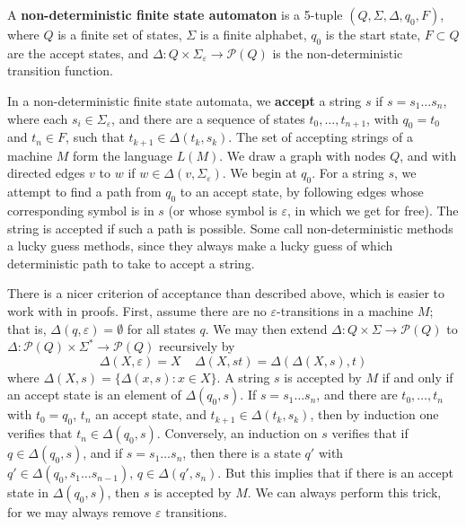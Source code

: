 A {\bf non-deterministic finite state automaton} is a 5-tuple $(Q, \Sigma, \Delta, q_0, F)$, where $Q$ is a finite set of states, $\Sigma$ is a finite alphabet, $q_0$ is the start state, $F \subset Q$ are the accept states, and $\Delta: Q \times \Sigma_\varepsilon \to \mathcal{P}(Q)$ is the non-deterministic transition function.

In a non-deterministic finite state automata, we {\bf accept} a string $s$ if $s = s_1 \dots s_n$, where each $s_i \in \Sigma_\varepsilon$, and there are a sequence of states $t_0, \dots, t_{n+1}$, with $q_0 = t_0$ and $t_n \in F$, such that $t_{k+1} \in \Delta(t_k, s_k)$. The set of accepting strings of a machine $M$ form the language $L(M)$. We draw a graph with nodes $Q$, and with directed edges $v$ to $w$ if $w \in \Delta(v, \Sigma_{\varepsilon})$. We begin at $q_0$. For a string $s$, we attempt to find a path from $q_0$ to an accept state, by following edges whose corresponding symbol is in $s$ (or whose symbol is $\varepsilon$, in which we get for free). The string is accepted if such a path is possible. Some call non-deterministic methods a lucky guess methods, since they always make a lucky guess of which deterministic path to take to accept a string.

There is a nicer criterion of acceptance than described above, which is easier to work with in proofs. First, assume there are no $\varepsilon$-transitions in a machine $M$; that is, $\Delta(q, \varepsilon) = \emptyset$ for all states $q$. We may then extend $\Delta: Q \times \Sigma \to \mathcal{P}(Q)$ to $\Delta: \mathcal{P}(Q) \times \Sigma^* \to \mathcal{P}(Q)$ recursively by
%
\[ \Delta(X, \varepsilon) = X \ \ \ \ \ \Delta(X, st) = \Delta(\Delta(X,s), t) \]
%
where $\Delta(X,s) = \{ \Delta(x,s) : x \in X \}$. A string $s$ is accepted by $M$ if and only if an accept state is an element of $\Delta(q_0, s)$. If $s = s_1 \dots s_n$, and there are $t_0, \dots, t_n$ with $t_0 = q_0$, $t_n$ an accept state, and $t_{k+1} \in \Delta(t_k, s_k)$, then by induction one verifies that $t_n \in \Delta(q_0, s)$. Conversely, an induction on $s$ verifies that if $q \in \Delta(q_0, s)$, and if $s = s_1 \dots s_n$, then there is a state $q'$ with $q' \in \Delta(q_0, s_1 \dots s_{n-1})$, $q \in \Delta(q', s_n)$. But this implies that if there is an accept state in $\Delta(q_0, s)$, then $s$ is accepted by $M$. We can always perform this trick, for we may always remove $\varepsilon$ transitions.

